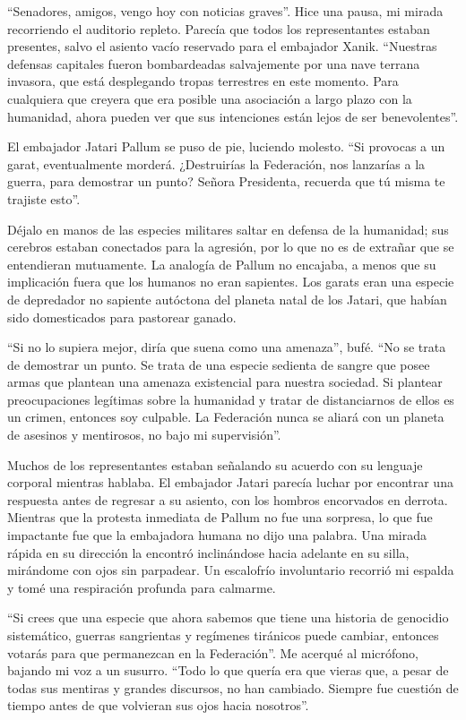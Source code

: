 \documentclass[spanish,12pt,a4paper,oneside,titlepage]{book}
\begin{document}
    ``Senadores, amigos, vengo hoy con noticias graves''. Hice una pausa, mi mirada recorriendo el auditorio repleto. Parecía que todos los representantes estaban presentes, salvo el asiento vacío reservado para el embajador Xanik. ``Nuestras defensas capitales fueron bombardeadas salvajemente por una nave terrana invasora, que está desplegando tropas terrestres en este momento. Para cualquiera que creyera que era posible una asociación a largo plazo con la humanidad, ahora pueden ver que sus intenciones están lejos de ser benevolentes''.

    El embajador Jatari Pallum se puso de pie, luciendo molesto. ``Si provocas a un garat, eventualmente morderá. ¿Destruirías la Federación, nos lanzarías a la guerra, para demostrar un punto? Señora Presidenta, recuerda que tú misma te trajiste esto''.

    Déjalo en manos de las especies militares saltar en defensa de la humanidad; sus cerebros estaban conectados para la agresión, por lo que no es de extrañar que se entendieran mutuamente. La analogía de Pallum no encajaba, a menos que su implicación fuera que los humanos no eran sapientes. Los garats eran una especie de depredador no sapiente autóctona del planeta natal de los Jatari, que habían sido domesticados para pastorear ganado.

    ``Si no lo supiera mejor, diría que suena como una amenaza'', bufé. ``No se trata de demostrar un punto. Se trata de una especie sedienta de sangre que posee armas que plantean una amenaza existencial para nuestra sociedad. Si plantear preocupaciones legítimas sobre la humanidad y tratar de distanciarnos de ellos es un crimen, entonces soy culpable. La Federación nunca se aliará con un planeta de asesinos y mentirosos, no bajo mi supervisión''.

    Muchos de los representantes estaban señalando su acuerdo con su lenguaje corporal mientras hablaba. El embajador Jatari parecía luchar por encontrar una respuesta antes de regresar a su asiento, con los hombros encorvados en derrota. Mientras que la protesta inmediata de Pallum no fue una sorpresa, lo que fue impactante fue que la embajadora humana no dijo una palabra. Una mirada rápida en su dirección la encontró inclinándose hacia adelante en su silla, mirándome con ojos sin parpadear. Un escalofrío involuntario recorrió mi espalda y tomé una respiración profunda para calmarme.

    ``Si crees que una especie que ahora sabemos que tiene una historia de genocidio sistemático, guerras sangrientas y regímenes tiránicos puede cambiar, entonces votarás para que permanezcan en la Federación''. Me acerqué al micrófono, bajando mi voz a un susurro. ``Todo lo que quería era que vieras que, a pesar de todas sus mentiras y grandes discursos, no han cambiado. Siempre fue cuestión de tiempo antes de que volvieran sus ojos hacia nosotros''.
\end{document}
